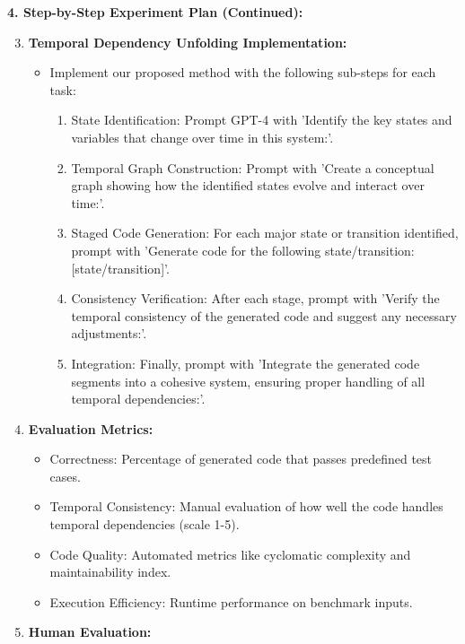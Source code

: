 \begin{tcolorbox}[colback=blue!5!white,colframe=blue!75!black,title=\textbf{Temporal Dependency Unfolding: Improving Code Generation for Complex Stateful Systems (Part 2)}]
\small{
\textbf{4. Step-by-Step Experiment Plan (Continued):}
\begin{enumerate}
    \setcounter{enumi}{2} 
    \item \textbf{Temporal Dependency Unfolding Implementation:}
    \begin{itemize}
        \item Implement our proposed method with the following sub-steps for each task:
        \begin{enumerate}
            \item State Identification: Prompt GPT-4 with 'Identify the key states and variables that change over time in this system:'.
            \item Temporal Graph Construction: Prompt with 'Create a conceptual graph showing how the identified states evolve and interact over time:'.
            \item Staged Code Generation: For each major state or transition identified, prompt with 'Generate code for the following state/transition: [state/transition]'.
            \item Consistency Verification: After each stage, prompt with 'Verify the temporal consistency of the generated code and suggest any necessary adjustments:'.
            \item Integration: Finally, prompt with 'Integrate the generated code segments into a cohesive system, ensuring proper handling of all temporal dependencies:'.
        \end{enumerate}
    \end{itemize}
    \item \textbf{Evaluation Metrics:}
    \begin{itemize}
        \item Correctness: Percentage of generated code that passes predefined test cases.
        \item Temporal Consistency: Manual evaluation of how well the code handles temporal dependencies (scale 1-5).
        \item Code Quality: Automated metrics like cyclomatic complexity and maintainability index.
        \item Execution Efficiency: Runtime performance on benchmark inputs.
    \end{itemize}
    \item \textbf{Human Evaluation:}

\end{enumerate}}
\end{tcolorbox}

